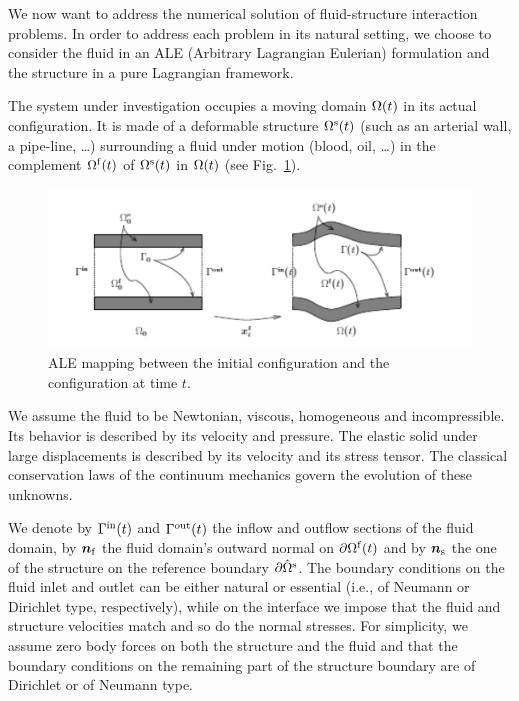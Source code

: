 We now want to address the numerical solution of fluid-structure interaction problems.
In order to address each problem in its natural setting, we
choose to consider the fluid in an ALE (Arbitrary Lagrangian
Eulerian) formulation and the structure in a pure Lagrangian framework.



The system under investigation occupies a moving domain $\Omega(t)$
in its actual configuration. It is made of a deformable structure
$\Omega^{{\mathrm{s}}}(t)$ (such as an arterial wall, a pipe-line, \ldots)
surrounding a fluid under motion (blood, oil, \ldots) in  the
complement $\Omega^{{\mathrm{f}}}(t)$ of  $\Omega^{{\mathrm{s}}}(t)$ in $\Omega(t)$ (see
Fig.~\ref{fig:ALEmapping}).

\begin{figure}[!h]
\begin{center}
\includegraphics[width=.8\textwidth]{ALEmapping.pdf}
\end{center}
\caption{ALE mapping between the initial configuration and the
configuration at time $t$.}\label{fig:ALEmapping}
\end{figure}

We assume the fluid to be Newtonian, viscous, homogeneous and
incompressible. Its behavior is described by its velocity and
pressure. The elastic solid under large displacements is
described by its velocity and its stress tensor. The classical
conservation laws of the continuum mechanics govern the evolution
of these unknowns.

We denote by $\Gamma^{\mathrm{in}}(t)$ and $\Gamma^{\mathrm{out}}(t)$ the inflow and outflow
sections of the fluid domain, by $\boldsymbol{n}_{\mathrm{f}}$ the  fluid domain's
outward normal on $\partial \Omega^{{\mathrm{f}}}(t)$ and by $\boldsymbol{n}_{\mathrm{s}}$ the one
of the structure on the reference boundary $\partial \hat\Omega^{{\mathrm{s}}}$.
The boundary conditions on the fluid inlet and outlet can be
either natural or essential (i.e., of Neumann or Dirichlet type,
respectively), while on the interface we impose that the fluid
and structure velocities match and so do the normal stresses. For
simplicity, we assume zero body forces on both the structure and
the fluid and that the boundary conditions on the remaining part
of the structure boundary are of Dirichlet or of Neumann type.

